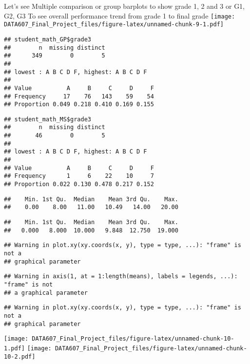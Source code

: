 \documentclass[
]{article}
\begin{document}
Let's see Multiple comparison or group barplots to show grade 1, 2 and 3
or G1, G2, G3 To see overall performance trend from grade 1 to final
grade
\texttt{[image: DATA607\_Final\_Project\_files/figure-latex/unnamed-chunk-9-1.pdf]}

\begin{verbatim}
## student_math_GP$grade3 
##        n  missing distinct 
##      349        0        5 
## 
## lowest : A B C D F, highest: A B C D F
##                                         
## Value          A     B     C     D     F
## Frequency     17    76   143    59    54
## Proportion 0.049 0.218 0.410 0.169 0.155
\end{verbatim}

\begin{verbatim}
## student_math_MS$grade3 
##        n  missing distinct 
##       46        0        5 
## 
## lowest : A B C D F, highest: A B C D F
##                                         
## Value          A     B     C     D     F
## Frequency      1     6    22    10     7
## Proportion 0.022 0.130 0.478 0.217 0.152
\end{verbatim}

\begin{verbatim}
##    Min. 1st Qu.  Median    Mean 3rd Qu.    Max. 
##    0.00    8.00   11.00   10.49   14.00   20.00
\end{verbatim}

\begin{verbatim}
##    Min. 1st Qu.  Median    Mean 3rd Qu.    Max. 
##   0.000   8.000  10.000   9.848  12.750  19.000
\end{verbatim}

\begin{verbatim}
## Warning in plot.xy(xy.coords(x, y), type = type, ...): "frame" is not a
## graphical parameter
\end{verbatim}

\begin{verbatim}
## Warning in axis(1, at = 1:length(means), labels = legends, ...): "frame" is not
## a graphical parameter
\end{verbatim}

\begin{verbatim}
## Warning in plot.xy(xy.coords(x, y), type = type, ...): "frame" is not a
## graphical parameter
\end{verbatim}

\texttt{[image: DATA607\_Final\_Project\_files/figure-latex/unnamed-chunk-10-1.pdf]}
\texttt{[image: DATA607\_Final\_Project\_files/figure-latex/unnamed-chunk-10-2.pdf]}
\end{document}
